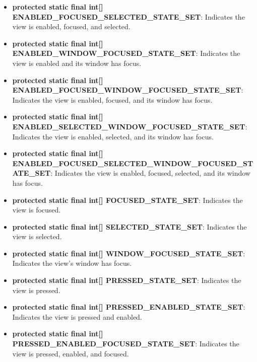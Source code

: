 \documentclass{report}
\begin{document}
\begin{itemize}
\begin{itemize}
                \item \textbf{protected static final int[] ENABLED\_FOCUSED\_SELECTED\_STATE\_SET}:  
                    Indicates the view is enabled, focused, and selected.

                \item \textbf{protected static final int[] ENABLED\_WINDOW\_FOCUSED\_STATE\_SET}:  
                    Indicates the view is enabled and its window has focus.

                \item \textbf{protected static final int[] ENABLED\_FOCUSED\_WINDOW\_FOCUSED\_STATE\_SET}:  
                    Indicates the view is enabled, focused, and its window has focus.

                \item \textbf{protected static final int[] ENABLED\_SELECTED\_WINDOW\_FOCUSED\_STATE\_SET}:  
                    Indicates the view is enabled, selected, and its window has focus.

                \item \textbf{protected static final int[] ENABLED\_FOCUSED\_SELECTED\_WINDOW\_FOCUSED\_STATE\_SET}:  
                    Indicates the view is enabled, focused, selected, and its window has focus.

                \item \textbf{protected static final int[] FOCUSED\_STATE\_SET}:  
                    Indicates the view is focused.

                \item \textbf{protected static final int[] SELECTED\_STATE\_SET}:  
                    Indicates the view is selected.

                \item \textbf{protected static final int[] WINDOW\_FOCUSED\_STATE\_SET}:  
                    Indicates the view's window has focus.

                \item \textbf{protected static final int[] PRESSED\_STATE\_SET}:  
                    Indicates the view is pressed.

                \item \textbf{protected static final int[] PRESSED\_ENABLED\_STATE\_SET}:  
                    Indicates the view is pressed and enabled.

                \item \textbf{protected static final int[] PRESSED\_ENABLED\_FOCUSED\_STATE\_SET}:  
                    Indicates the view is pressed, enabled, and focused.


\end{itemize}
\end{itemize}
\end{document}
